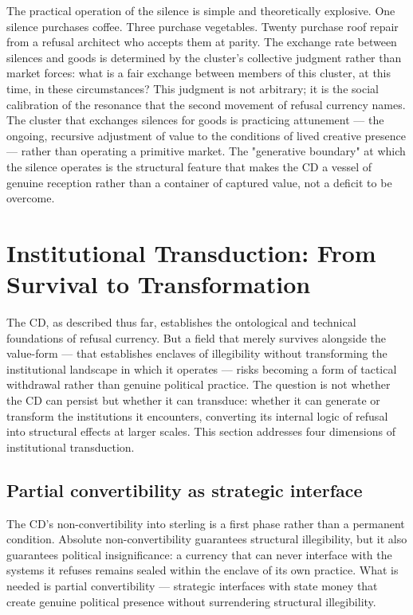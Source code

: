 The practical operation of the silence is simple and theoretically explosive. One silence purchases coffee. Three purchase vegetables. Twenty purchase roof repair from a refusal architect who accepts them at parity. The exchange rate between silences and goods is determined by the cluster's collective judgment rather than market forces: what is a fair exchange between members of this cluster, at this time, in these circumstances? This judgment is not arbitrary; it is the social calibration of the resonance that the second movement of refusal currency names. The cluster that exchanges silences for goods is practicing attunement — the ongoing, recursive adjustment of value to the conditions of lived creative presence — rather than operating a primitive market. The "generative boundary" at which the silence operates is the structural feature that makes the CD a vessel of genuine reception rather than a container of captured value, not a deficit to be overcome.

\section{Institutional Transduction: From Survival to Transformation}

The CD, as described thus far, establishes the ontological and technical foundations of refusal currency. But a field that merely survives alongside the value-form — that establishes enclaves of illegibility without transforming the institutional landscape in which it operates — risks becoming a form of tactical withdrawal rather than genuine political practice. The question is not whether the CD can persist but whether it can transduce: whether it can generate or transform the institutions it encounters, converting its internal logic of refusal into structural effects at larger scales. This section addresses four dimensions of institutional transduction.

\subsection{Partial convertibility as strategic interface}

The CD's non-convertibility into sterling is a first phase rather than a permanent condition. Absolute non-convertibility guarantees structural illegibility, but it also guarantees political insignificance: a currency that can never interface with the systems it refuses remains sealed within the enclave of its own practice. What is needed is partial convertibility — strategic interfaces with state money that create genuine political presence without surrendering structural illegibility.

